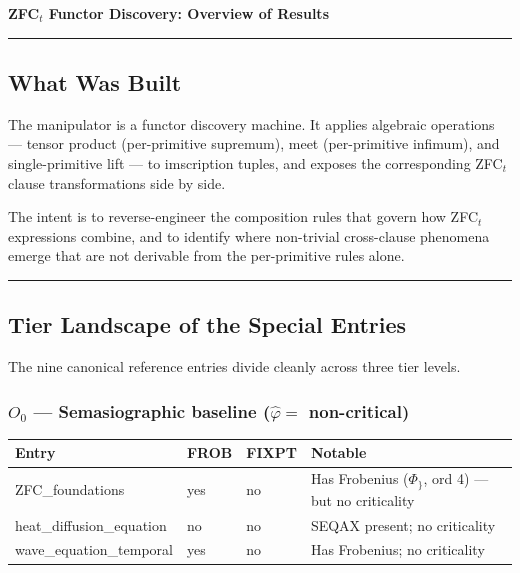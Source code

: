 \documentclass[12pt,a4paper]{article}
\begin{document}
\begin{center}
{\Large\bfseries ZFC$_t$ Functor Discovery: Overview of Results}

\rule{0.5\textwidth}{0.4pt}
\end{center}

\subsection*{What Was Built}

The manipulator is a functor discovery machine. It applies algebraic operations ---
tensor product (per-primitive supremum), meet (per-primitive infimum), and single-primitive lift ---
to imscription tuples, and exposes the corresponding ZFC$_t$ clause transformations side by side.

The intent is to reverse-engineer the composition rules that govern how ZFC$_t$ expressions combine, and to identify where non-trivial cross-clause phenomena emerge that are not derivable from the per-primitive rules alone.

\begin{center}
\rule{0.5\textwidth}{0.4pt}
\end{center}

\subsection*{Tier Landscape of the Special Entries}

The nine canonical reference entries divide cleanly across three tier levels.

\subsubsection*{$O_0$ --- Semasiographic baseline ($\hat{\varphi} =$ non-critical)}

\begin{table}[htbp]
\centering
\small

\begin{tabularx}{\textwidth}{>{\raggedright\arraybackslash}X >{\centering\arraybackslash}X >{\centering\arraybackslash}X >{\raggedright\arraybackslash}X}
\toprule
\textbf{Entry} & \textbf{FROB} & \textbf{FIXPT} & \textbf{Notable} \\
\midrule

ZFC\_foundations & yes & no & Has Frobenius ($\Phi_{\}}$, ord 4) --- but no criticality \\
heat\_diffusion\_equation & no & no & SEQAX present; no criticality \\
wave\_equation\_temporal & yes & no & Has Frobenius; no criticality \\
\bottomrule
\end{tabularx}
\end{table}
\end{document}
